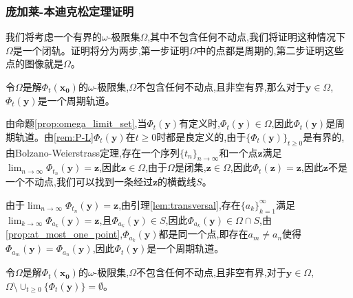 \subsubsection{庞加莱-本迪克松定理证明}

我们将考虑一个有界的$\omega$-极限集$\Omega$,其中不包含任何不动点,我们将证明这种情况下$\Omega$是一个闭轨。证明将分为两步,第一步证明$\Omega$中的点都是周期的,第二步证明这些点的图像就是$\Omega$。
\begin{prop}\label{prop:periodic_orbit}
    令$\Omega$是解$\Phi_t(\mathbf{x_0})$的$\omega$-极限集,$\Omega$不包含任何不动点,且非空有界,那么对于$\mathbf{y}\in \Omega$,$\Phi_t(\mathbf{y})$是一个周期轨道。
\end{prop}
\begin{pf}
    由命题\ref{prop:omega_limit_set},当$\Phi_t(\mathbf{y})$有定义时,$\Phi_t(\mathbf{y})\in \Omega$,因此$\Phi_t(\mathbf{y})$是周期轨道。由\ref{rem:P-L}$\Phi_t(\mathbf{y})$在$t\geq 0$时都是良定义的,由于$\{\Phi_t(\mathbf{y})\}_{t\geq 0}$是有界的,由Bolzano-Weierstrass定理,存在一个序列$\{t_n\}_{n\to\infty}$和一个点$\mathbf{z}$满足$\lim_{n\to\infty}\Phi_{t_n}(\mathbf{y})=\mathbf{z}$,因此$\mathbf{z}\in \Omega$,由于$\Omega$是闭集,$\mathbf{z}\in \Omega$,因此$\Phi_t(\mathbf{z})=\mathbf{z}$,因此$\mathbf{z}$不是一个不动点,我们可以找到一条经过$\mathbf{z}$的横截线$S$。

    由于$\lim_{n\to\infty}\Phi_{t_n}(\mathbf{y})=\mathbf{z}$,由引理\ref{lem:transversal},存在$\{a_k\}_{k=1}^{\infty}$满足$\lim_{k\to\infty}\Phi_{a_k}(\mathbf{y})=\mathbf{z}$,且$\Phi_{a_k}(\mathbf{y})\in S$,因此$\Phi_{a_k}(\mathbf{y})\in \Omega\cap S$,由\ref{prop:at_most_one_point},$\Phi_{a_k}(\mathbf{y})$都是同一个点,即存在$a_m\neq a_n$使得$\Phi_{a_m}(\mathbf{y})=\Phi_{a_n}(\mathbf{y})$,因此$\Phi_t(\mathbf{y})$是一个周期轨道。
\end{pf}
\begin{prop}\label{prop:closed_orbit}
    令$\Omega$是解$\Phi_t(\mathbf{x_0})$的$\omega$-极限集,$\Omega$不包含任何不动点,且非空有界,对于$\mathbf{y}\in\Omega$,$\Omega\setminus\cup_{t\geq 0}\{\Phi_t(\mathbf{y})\}=\emptyset$。
\end{prop}
